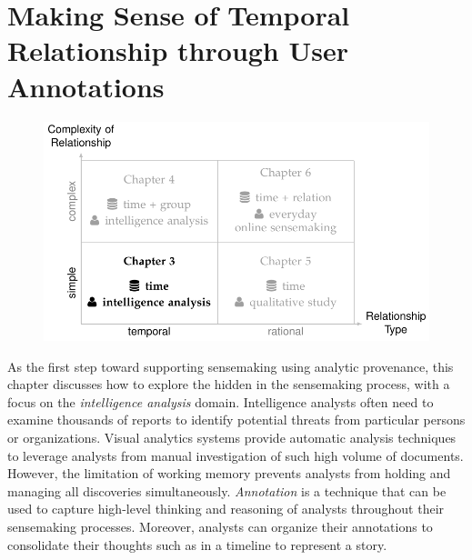\chapter{Making Sense of Temporal Relationship through User Annotations}
\label{chap:schemaline}

\graphicspath{{Chapter3/figures/}}

\vspace{0.6in}

\begin{figure}[!htb]
	\centering
	\includegraphics{work-ch3}
\end{figure}

\pagebreak

As the first step toward supporting sensemaking using analytic provenance, this chapter discusses how to explore the  hidden in the sensemaking process, with a focus on the \emph{intelligence analysis} domain. Intelligence analysts often need to examine thousands of reports to identify potential threats from particular persons or organizations. Visual analytics systems provide automatic analysis techniques to leverage analysts from manual investigation of such high volume of documents. However, the limitation of working memory prevents analysts from holding and managing all discoveries simultaneously. \emph{Annotation} is a technique that can be used to capture high-level thinking and reasoning of analysts throughout their sensemaking processes. Moreover, analysts can organize their annotations to consolidate their thoughts such as in a timeline to represent a story.

